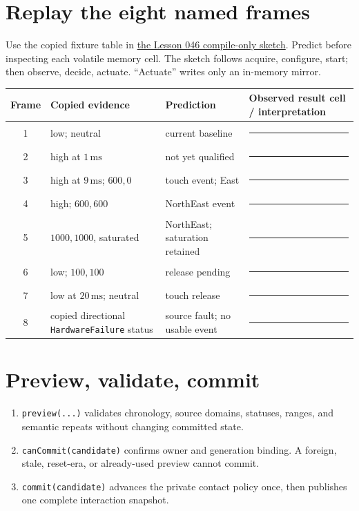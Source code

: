 \documentclass[11pt]{article}
\newcommand{\blankline}{\rule{0.9in}{0.4pt}}
\begin{document}
\newpage
\section{Replay the eight named frames}
Use the copied fixture table in
\href{https://github.com/spincyc/adk/blob/main/examples/Lesson046InteractionIntent/Lesson046InteractionIntent.ino}
{the Lesson 046 compile-only sketch}. Predict before inspecting each volatile
memory cell. The sketch follows acquire, configure, start; then observe,
decide, actuate. ``Actuate'' writes only an in-memory mirror.

\begin{tabularx}{\linewidth}{@{}c l X X@{}}
\toprule
Frame & Copied evidence & Prediction & Observed result cell / interpretation\\
\midrule
1 & low; neutral & current baseline & \blankline\\[6pt]
2 & high at \(1\,\mathrm{ms}\) & not yet qualified & \blankline\\[6pt]
3 & high at \(9\,\mathrm{ms}\); \(600,0\) & touch event; East & \blankline\\[6pt]
4 & high; \(600,600\) & NorthEast event & \blankline\\[6pt]
5 & \(1000,1000\), saturated & NorthEast; saturation retained & \blankline\\[6pt]
6 & low; \(100,100\) & release pending & \blankline\\[6pt]
7 & low at \(20\,\mathrm{ms}\); neutral & touch release & \blankline\\[6pt]
8 & copied directional \texttt{HardwareFailure} status & source fault; no usable event & \blankline\\
\bottomrule
\end{tabularx}

\section{Preview, validate, commit}
\begin{enumerate}
 \item \texttt{preview(...)} validates
       chronology, source domains, statuses, ranges, and semantic repeats
       without changing committed state.
 \item \texttt{canCommit(candidate)} confirms owner and generation binding.
       A foreign, stale, reset-era, or already-used preview cannot commit.
 \item \texttt{commit(candidate)} advances the private contact policy once,
       then publishes one complete interaction snapshot.
\end{enumerate}
\end{document}
